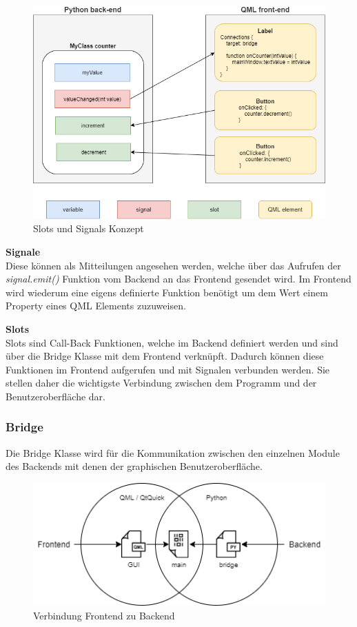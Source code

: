 \begin{figure}[H]
	\begin{center}
		\includegraphics[scale=0.4]{figures/hcis/signals_slots.png}
		\caption{Slots und Signals Konzept}
	\end{center}
\end{figure}

\textbf{Signale}\\ \medskip
Diese können als Mitteilungen angesehen werden, welche über das Aufrufen der \textit{signal.emit()} Funktion vom Backend an das Frontend gesendet wird. Im Frontend wird wiederum eine eigens definierte Funktion benötigt um dem Wert einem Property eines QML Elements zuzuweisen.
\medskip

\textbf{Slots}\\ \medskip
Slots sind Call-Back Funktionen, welche im Backend definiert werden und sind über die Bridge Klasse mit dem Frontend verknüpft. Dadurch können diese Funktionen im Frontend aufgerufen und mit Signalen verbunden werden. Sie stellen daher die wichtigste Verbindung zwischen dem Programm und der Benutzeroberfläche dar.

\newpage
	
\subsubsection{Bridge}

Die Bridge Klasse wird für die Kommunikation zwischen den einzelnen Module des Backends mit denen der graphischen Benutzeroberfläche. 

\begin{figure}[H]
	\begin{center}
		\includegraphics[scale=1]{figures/hcis/bridge.png}
		\caption{Verbindung Frontend zu Backend}
	\end{center}
\end{figure}

